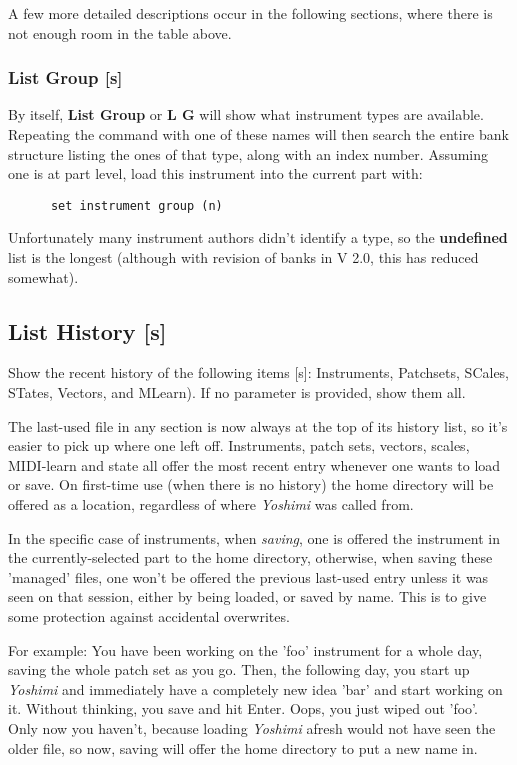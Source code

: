 A few more detailed descriptions occur in the following sections, where there
is not enough room in the table above.

\subsubsection{List Group [s]}
\label{subsec:command_line_instrument_group_list}
   By itself, \textbf{List Group} or \textbf{L G} will show what instrument
   types are available. Repeating the command with one of these names will
   then search the entire bank structure listing the ones of that type, along
   with an index number. Assuming one is at part level, load this instrument
   into the current part with:
   \begin{verbatim}
      set instrument group (n)
   \end{verbatim}

   Unfortunately many instrument authors didn't identify a type, so the
   \textbf{undefined} list is the longest (although with revision
   of banks in V 2.0, this has reduced somewhat).

\subsection{List History [s]}
\label{subsec:command_line_list_history}

   Show the recent history of the following items [s]:
   Instruments, Patchsets, SCales, STates, Vectors, and MLearn).
   If no parameter is provided, show them all.

   The last-used file in any section is now always at the top of its history
   list, so it's easier to pick up where one left off. Instruments, patch
   sets, vectors, scales, MIDI-learn and state all offer the most recent
   entry whenever one wants to load or save.  On first-time use (when there
   is no history) the home directory will be offered as a location,
   regardless of where \textsl{Yoshimi} was called from.

   In the specific case of instruments, when \textsl{saving}, one is offered
   the instrument in the currently-selected part to the home directory,
   otherwise, when saving these 'managed' files, one won't be offered the
   previous last-used entry unless it was seen on that session, either by
   being loaded, or saved by name. This is to give some protection against
   accidental overwrites.

   For example:
   You have been working on the 'foo' instrument
   for a whole day, saving the whole patch set as you
   go. Then, the following day, you start up \textsl{Yoshimi}
   and immediately have a completely
   new idea 'bar' and start working on it. Without thinking, you save and hit
   Enter. Oops, you just wiped out 'foo'.
   Only now you haven't, because loading \textsl{Yoshimi}
   afresh would not have seen the older file, so now, saving
   will offer the home directory to put a new name in.

